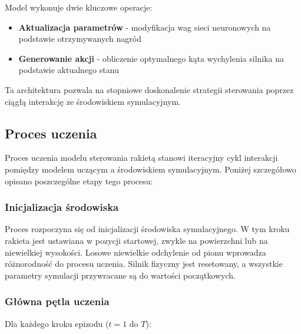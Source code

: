 Model wykonuje dwie kluczowe operacje:

\begin{itemize}
    \item \textbf{Aktualizacja parametrów} - modyfikacja wag sieci neuronowych na podstawie otrzymywanych nagród
    \item \textbf{Generowanie akcji} - obliczenie optymalnego kąta wychylenia silnika na podstawie aktualnego stanu
\end{itemize}

Ta architektura pozwala na stopniowe doskonalenie strategii sterowania poprzez ciągłą interakcję ze środowiskiem symulacyjnym.

\subsection{Proces uczenia}
\label{subsec:proces-uczenia}

Proces uczenia modelu sterowania rakietą stanowi iteracyjny cykl interakcji pomiędzy modelem uczącym a środowiskiem symulacyjnym. Poniżej szczegółowo opisano poszczególne etapy tego procesu:

\subsubsection{Inicjalizacja środowiska}
Proces rozpoczyna się od inicjalizacji środowiska symulacyjnego. W tym kroku rakieta jest ustawiana w pozycji startowej, zwykle na powierzchni lub na niewielkiej wysokości. Losowe niewielkie odchylenie od pionu wprowadza różnorodność do procesu uczenia. Silnik fizyczny jest resetowany, a wszystkie parametry symulacji przywracane są do wartości początkowych.

\subsubsection{Główna pętla uczenia}
Dla każdego kroku epizodu ($t = 1$ do $T$):


